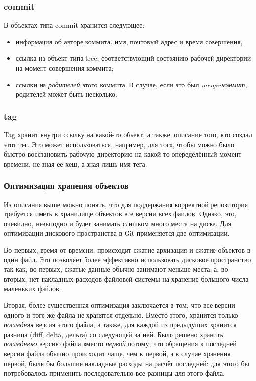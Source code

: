\subsubsection{commit}

В объектах типа commit хранится следующее:

\begin{itemize}
\item информация об авторе коммита: имя, почтовый адрес и время
  совершения;
\item ссылка на объект типа tree, соответствующий состоянию рабочей
  директории на момент совершения коммита;
\item ссылки на \emph{родителей} этого коммита. В случае, если это был
  \emph{merge-коммит}, родителей может быть несколько.
\end{itemize}

\subsubsection{tag}

Tag хранит внутри ссылку на какой-то объект, а также, описание того,
кто создал этот тег. Это может использоваться, например, для того,
чтобы можно было быстро восстановить рабочую директорию на какой-то
опеределённый момент времени, не зная её хеш, а зная лишь имя тега.

\subsubsection{Оптимизация хранения объектов}

Из описания выше можно понять, что для поддержания корректной
репозитория требуется иметь в хранилище объектов все версии всех
файлов. Однако, это, очевидно, невыгодно и будет занимать слишком
много места на диске. Для оптимизации дискового пространства в Git
применяется две оптимизации. 

Во-первых, время от времени, происходит сжатие архивация и сжатие
объектов в один файл. Это позволяет более эффективно использовать
дисковое пространство так как, во-первых, сжатые данные обычно
занимают меньше места, а, во-вторых, нет накладных расходов файловой
системы на хранение большого числа маленьких файлов.

Вторая, более существенная оптимизация заключается в том, что все
версии одного и того же файла не хранятся отдельно. Вместо этого,
хранится только \emph{последняя} версия этого файла, а также, для
каждой из предыдущих хранится разница (diff, delta, дельта) со
следующей за ней. Было решено хранить \emph{последнюю} версию файла
вместо \emph{первой} потому, что обращения к последней версии файла
обычно происходит чаще, чем к первой, а в случае хранения первой, были
бы большие накладные расходы на расчёт последней: для этого бы
потребовалось применить последовательно все разницы для этого файла.

